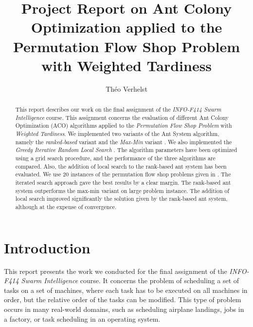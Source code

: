 \documentclass[runningheads]{llncs}
\begin{document}
\title{Project Report on Ant Colony Optimization applied to the Permutation Flow Shop Problem with Weighted Tardiness}


\author{Théo Verhelst}


\maketitle

\begin{abstract}

This report describes our work on the final assignment of the \emph{INFO-F414
Swarm Intelligence} course. This assignment concerns the evaluation of different
Ant Colony Optimization (ACO) algorithms applied to the \emph{Permutation Flow
Shop Problem} with \emph{Weighted Tardiness}. We implemented two variants of the
Ant System algorithm, namely the \emph{ranked-based} variant and the
\emph{Max-Min} variant \cite{stutzle1998ant}. We also implemented the
\emph{Greedy Iterative Random Local Search} \cite{karabulut2016hybrid}. The
algorithm parameters have been optimized using a grid search procedure, and the
performance of the three algorithms are compared. Also, the addition of local
search to the rank-based ant system has been evaluated. We use 20 instances of
the permutation flow shop problems given in \cite{taillard1993benchmarks}. The
iterated search approach gave the best results by a clear margin. The rank-based
ant system outperforms the max-min variant on large problem instance. The
addition of local search improved significantly the solution given by the
rank-based ant system, although at the expense of convergence.

\end{abstract}

\section{Introduction}

This report presents the work we conducted for the final assignment of the
\emph{INFO-F414 Swarm Intelligence} course. It concerns the problem of
scheduling a set of tasks on a set of machines, where each task has to be
executed on all machines in order, but the relative order of the tasks can be
modified. This type of problem occurs in many real-world domains, such as
scheduling airplane landings, jobs in a factory, or task scheduling in an
operating system.
\end{document}
